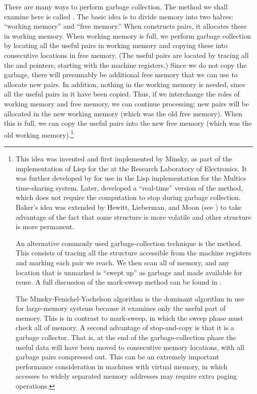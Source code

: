 There are many ways to perform garbage collection.  The method we shall examine
here is called .  The basic idea is to divide memory
into two halves: ``working memory'' and ``free memory.''  When 
constructs pairs, it allocates these in working memory.  When working memory is
full, we perform garbage collection by locating all the useful pairs in working
memory and copying these into consecutive locations in free memory.  (The
useful pairs are located by tracing all the  and  pointers,
starting with the machine registers.)  Since we do not copy the garbage, there
will presumably be additional free memory that we can use to allocate new
pairs.  In addition, nothing in the working memory is needed, since all the
useful pairs in it have been copied.  Thus, if we interchange the roles of
working memory and free memory, we can continue processing; new pairs will be
allocated in the new working memory (which was the old free memory).  When this
is full, we can copy the useful pairs into the new free memory (which was the
old working memory).\footnote{This idea was invented and first implemented by
Minsky, as part of the implementation of Lisp for the  at the
 Research Laboratory of Electronics.  It was further developed by
 for use in the Lisp implementation for the
Multics time-sharing system.  Later,  developed a ``real-time''
version of the method, which does not require the computation to stop during
garbage collection.  Baker's idea was extended by Hewitt, Lieberman, and Moon
(see ) to take advantage of the fact that some
structure is more volatile and other structure is more permanent.

An alternative commonly used garbage-collection technique is the
 method.  This consists of tracing all the structure
accessible from the machine registers and marking each pair we reach.  We then
scan all of memory, and any location that is unmarked is ``swept up'' as
garbage and made available for reuse.  A full discussion of the mark-sweep
method can be found in .

The Minsky-Fenichel-Yochelson algorithm is the dominant algorithm in use for
large-memory systems because it examines only the useful part of memory.  This
is in contrast to mark-sweep, in which the sweep phase must check all of
memory.  A second advantage of stop-and-copy is that it is a
 garbage collector.  That is, at the end of the
garbage-collection phase the useful data will have been moved to consecutive
memory locations, with all garbage pairs compressed out.  This can be an
extremely important performance consideration in machines with virtual memory,
in which accesses to widely separated memory addresses may require extra paging
operations.}

